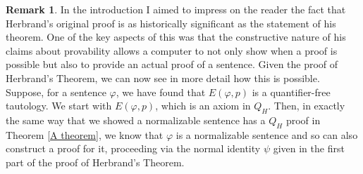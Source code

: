 \documentclass[a4paper,12pt]{report}
\theoremstyle{definition}
\newtheorem{remark}[lem]{Remark}
\begin{document}
\begin{remark} 
\label{con remark}
In the introduction I aimed to impress on the reader the fact that Herbrand's original proof is as historically significant as the statement of his theorem. One of the key aspects of this was that the constructive nature of his claims about provability allows a computer to not only show when a proof is possible but also to provide an actual proof of a sentence. Given the proof of Herbrand's Theorem, we can now see in more detail how this is possible. Suppose, for a sentence $\varphi$, we have found that $E(\varphi, p)$ is a quantifier-free tautology. We start with $E(\varphi, p)$, which is an axiom in $Q_H$. Then, in exactly the same way that we showed a normalizable sentence has a $Q_H$ proof in Theorem \ref{A theorem}, we know that $\varphi$ is a normalizable sentence and so can also construct a proof for it, proceeding via the normal identity $\psi$ given in the first part of the proof of Herbrand's Theorem.
\end{remark}
\end{document}
